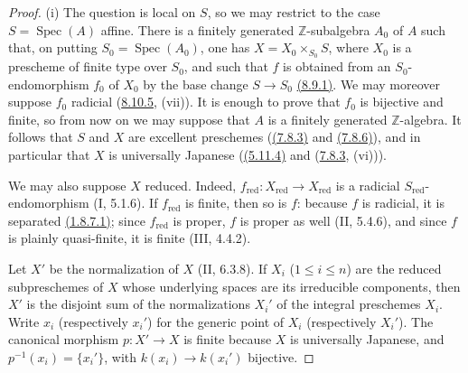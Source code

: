\begin{proof}
\textup{(i)} The question is local on $S$, so we may restrict to the
case $S=\operatorname{Spec}(A)$ affine.  There is a finitely generated
$\mathbb Z$-subalgebra $A_0$ of $A$ such that, on putting
$S_0=\operatorname{Spec}(A_0)$, one has
$X=X_0\times_{S_0}S$, where $X_0$ is a prescheme of finite type over
$S_0$, and such that $f$ is obtained from an $S_0$-endomorphism $f_0$
of $X_0$ by the base change $S\to S_0$ {\hyperlink{ega4.c04.prop.8-9-1}{(8.9.1)}}.  We may moreover
suppose $f_0$ radicial ({\hyperlink{ega4.c04.thm.8-10-5}{8.10.5}}, (vii)).  It is enough to prove that
$f_0$ is bijective and finite, so from now on we may suppose that $A$
is a finitely generated $\mathbb Z$-algebra.  It follows that $S$ and
$X$ are excellent preschemes ({\hyperlink{ega4.c04.statement.7-8-3}{(7.8.3)}} and {\hyperlink{ega4.c04.prop.7-8-6}{(7.8.6)}}), and in particular
that $X$ is universally Japanese ({\hyperlink{ega4.c04.cor.5-11-4}{(5.11.4)}} and ({\hyperlink{ega4.c04.statement.7-8-3}{7.8.3}}, (vi))).

We may also suppose $X$ reduced.  Indeed,
$f_{\mathrm{red}}:X_{\mathrm{red}}\to X_{\mathrm{red}}$ is a radicial
$S_{\mathrm{red}}$-endomorphism (I, 5.1.6).  If
$f_{\mathrm{red}}$ is finite, then so is $f$: because $f$ is radicial,
it is separated {\hyperlink{ega4.c04.lem.1-8-7-1}{(1.8.7.1)}}; since $f_{\mathrm{red}}$ is proper, $f$ is
proper as well (II, 5.4.6), and since $f$ is plainly quasi-finite, it is
finite (III, 4.4.2).

Let $X'$ be the normalization of $X$ (II, 6.3.8).  If
$X_i$ ($1\leq i\leq n$) are the reduced subpreschemes of $X$ whose
underlying spaces are its irreducible components, then $X'$ is the
disjoint sum of the normalizations $X_i'$ of the integral preschemes
$X_i$.  Write $x_i$ (respectively $x_i'$) for the generic point of
$X_i$ (respectively $X_i'$).  The canonical morphism $p:X'\to X$ is
finite because $X$ is universally Japanese, and
$p^{-1}(x_i)=\{x_i'\}$, with $k(x_i)\to k(x_i')$ bijective.


\end{proof}
